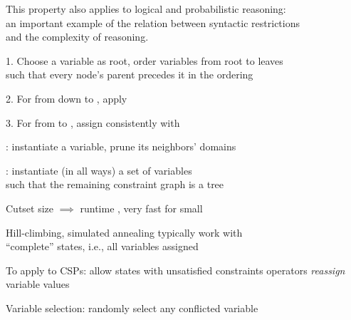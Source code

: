 \documentclass{article}
\begin{document}
\begin{huge}
This property also applies to logical and probabilistic reasoning:\\
an important example of the relation between syntactic restrictions\\
and the complexity of reasoning.




1. Choose a variable as root, order variables from root to leaves\\
such that every node's parent precedes it in the ordering 

\vspace*{0.2in}

\textwidth
{}

2. For  from  down to , apply 

3. For  from  to , assign  consistently with 


: instantiate a variable, prune its neighbors' domains

\vspace*{0.2in}

\textwidth
{}



: instantiate (in all ways) a set of variables\\ 
such that the remaining constraint graph is a tree

Cutset size  $\implies$ runtime , very fast for small 




Hill-climbing, simulated annealing typically work with\\
``complete'' states, i.e., all variables assigned

To apply to CSPs:\al
allow states with unsatisfied constraints\al
operators \emph{reassign} variable values

Variable selection: randomly select any conflicted variable


\end{huge}
\end{document}
